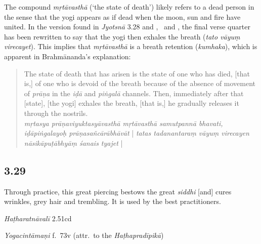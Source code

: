 \begin{ekdosis}
\begin{philcomm}[hp03_028]
The compound \emph{mṛtāvasthā} (`the state of death') likely refers to a dead person in the sense that the yogi appears as if dead when the moon, sun and fire have united. In the version found in \emph{Jyotsnā} 3.28 and \etaOne, \etaTwo\ and \epsilonThree, the final verse quarter has been rewritten to say that the yogi then exhales the breath (\emph{tato vāyuṃ virecayet}). This implies that \emph{mṛtāvasthā} is a breath retention (\emph{kumhaka}), which is apparent in Brahmānanda's explanation:
\begin{quote}
The state of death that has arisen is the state of one who has died, [that is,] of one who is devoid of the breath because of the absence of movement of \emph{prāṇa} in the \emph{iḍā} and \emph{piṅgalā} channels. Then, immediately after that [state], [the yogi] exhales the breath, [that is,] he gradually releases it through the nostrils.\\
\emph{mṛtasya prāṇaviyuktasyāvasthā mṛtāvasthā samutpannā bhavati, iḍāpiṅgalayoḥ prāṇasañcārābhāvāt} | \emph{tatas tadanantaraṃ vāyuṃ virecayen nāsikāpuṭābhyāṃ śanais tyajet} |
\end{quote}

\end{philcomm}

\subsection*{3.29}
\begin{translation}[hp03_029]
Through practice, this great piercing bestows the great \emph{siddhi} [and] cures wrinkles, grey hair and trembling. It is used by the best practitioners.
\end{translation}


\begin{testimonia}[hp03_029]
\emph{Haṭharatnāvalī} 2.51cd
\begin{versinnote}
\end{versinnote}

\emph{Yogacintāmaṇi} f.~73v (attr.~to the \emph{Haṭhapradīpikā})
\begin{versinnote}
\end{versinnote}


\end{testimonia}
\end{ekdosis}
